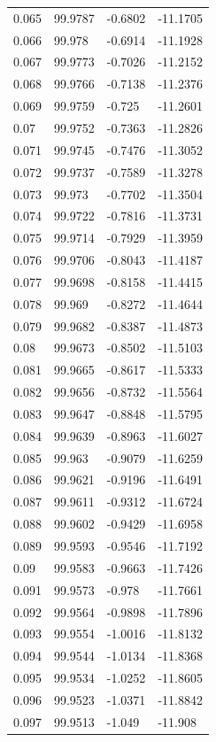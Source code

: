 \begin{tabular}{llll}
0.065 & 99.9787 & -0.6802 & -11.1705 \\
0.066 & 99.978 & -0.6914 & -11.1928 \\
0.067 & 99.9773 & -0.7026 & -11.2152 \\
0.068 & 99.9766 & -0.7138 & -11.2376 \\
0.069 & 99.9759 & -0.725 & -11.2601 \\
0.07 & 99.9752 & -0.7363 & -11.2826 \\
0.071 & 99.9745 & -0.7476 & -11.3052 \\
0.072 & 99.9737 & -0.7589 & -11.3278 \\
0.073 & 99.973 & -0.7702 & -11.3504 \\
0.074 & 99.9722 & -0.7816 & -11.3731 \\
0.075 & 99.9714 & -0.7929 & -11.3959 \\
0.076 & 99.9706 & -0.8043 & -11.4187 \\
0.077 & 99.9698 & -0.8158 & -11.4415 \\
0.078 & 99.969 & -0.8272 & -11.4644 \\
0.079 & 99.9682 & -0.8387 & -11.4873 \\
0.08 & 99.9673 & -0.8502 & -11.5103 \\
0.081 & 99.9665 & -0.8617 & -11.5333 \\
0.082 & 99.9656 & -0.8732 & -11.5564 \\
0.083 & 99.9647 & -0.8848 & -11.5795 \\
0.084 & 99.9639 & -0.8963 & -11.6027 \\
0.085 & 99.963 & -0.9079 & -11.6259 \\
0.086 & 99.9621 & -0.9196 & -11.6491 \\
0.087 & 99.9611 & -0.9312 & -11.6724 \\
0.088 & 99.9602 & -0.9429 & -11.6958 \\
0.089 & 99.9593 & -0.9546 & -11.7192 \\
0.09 & 99.9583 & -0.9663 & -11.7426 \\
0.091 & 99.9573 & -0.978 & -11.7661 \\
0.092 & 99.9564 & -0.9898 & -11.7896 \\
0.093 & 99.9554 & -1.0016 & -11.8132 \\
0.094 & 99.9544 & -1.0134 & -11.8368 \\
0.095 & 99.9534 & -1.0252 & -11.8605 \\
0.096 & 99.9523 & -1.0371 & -11.8842 \\
0.097 & 99.9513 & -1.049 & -11.908 \\

\end{tabular}
